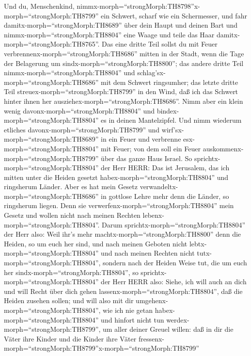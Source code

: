  Und du, Menschenkind,
nimmx-morph=``strongMorph:TH8798''x-morph=``strongMorph:TH8799'' ein
Schwert, scharf wie ein Schermesser, und fahr
damitx-morph=``strongMorph:TH8689'' über dein Haupt und deinen Bart und
nimmx-morph=``strongMorph:TH8804'' eine Waage und teile das Haar
damitx-morph=``strongMorph:TH8765''.  Das eine dritte Teil
sollst du mit Feuer verbrennenx-morph=``strongMorph:TH8686'' mitten in
der Stadt, wenn die Tage der Belagerung um
sindx-morph=``strongMorph:TH8800''; das andere dritte Teil
nimmx-morph=``strongMorph:TH8804'' und
schlag'sx-morph=``strongMorph:TH8686'' mit dem Schwert ringsumher; das
letzte dritte Teil streuex-morph=``strongMorph:TH8799'' in den Wind, daß
ich das Schwert hinter ihnen her ausziehex-morph=``strongMorph:TH8686''.
 Nimm aber ein klein wenig
davonx-morph=``strongMorph:TH8804'' und
bindex-morph=``strongMorph:TH8804'' es in deinen Mantelzipfel.
 Und nimm wiederum etliches
davonx-morph=``strongMorph:TH8799'' und
wirf'sx-morph=``strongMorph:TH8689'' in ein Feuer und verbrenne
esx-morph=``strongMorph:TH8804'' mit Feuer; von dem soll ein Feuer
auskommenx-morph=``strongMorph:TH8799'' über das ganze Haus Israel.
 So sprichtx-morph=``strongMorph:TH8804'' der Herr HERR: Das
ist Jerusalem, das ich mitten unter die Heiden gesetzt
habex-morph=``strongMorph:TH8804'' und ringsherum Länder. 
Aber es hat mein Gesetz verwandeltx-morph=``strongMorph:TH8686'' in
gottlose Lehre mehr denn die Länder, so ringsherum liegen. Denn sie
verwerfenx-morph=``strongMorph:TH8804'' mein Gesetz und wollen nicht
nach meinen Rechten lebenx-morph=``strongMorph:TH8804''. 
Darum sprichtx-morph=``strongMorph:TH8804'' der Herr also: Weil ihr's
mehr machtx-morph=``strongMorph:TH8800'' denn die Heiden, so um euch her
sind, und nach meinen Geboten nicht lebtx-morph=``strongMorph:TH8804''
und nach meinen Rechten nicht tutx-morph=``strongMorph:TH8804'', sondern
nach der Heiden Weise tut, die um euch her
sindx-morph=``strongMorph:TH8804'',  so
sprichtx-morph=``strongMorph:TH8804'' der Herr HERR also: Siehe, ich
will auch an dich und will Recht über dich gehen
lassenx-morph=``strongMorph:TH8804'', daß die Heiden zusehen sollen;
 und will also mit dir
umgehenx-morph=``strongMorph:TH8804'', wie ich nie getan
habex-morph=``strongMorph:TH8804'' und hinfort nicht tun
werdex-morph=``strongMorph:TH8799'', um aller deiner Greuel willen:
 daß in dir die Väter ihre Kinder und die Kinder ihre Väter
fressenx-morph=``strongMorph:TH8799''x-morph=``strongMorph:TH8799''
